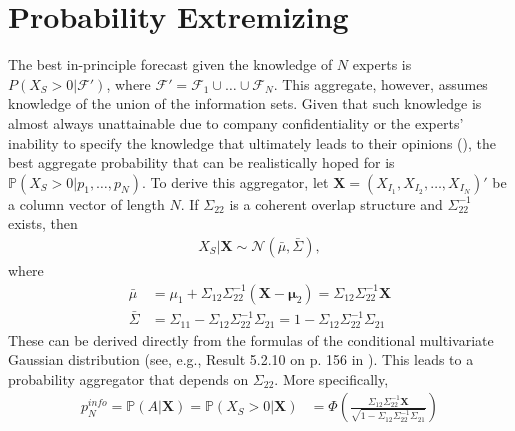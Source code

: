 \documentclass[11pt]{article}
\renewcommand{\P}{\mathbb{P}}
\theoremstyle{definition}
\theoremstyle{definition}
\begin{document}
\section{Probability Extremizing}
\label{extremizing}
The best in-principle forecast given the knowledge of $N$ experts is $P(X_{S} > 0 |  \mathcal{F}')$, where $\mathcal{F}' = \mathcal{F}_1 \cup \dots \cup \mathcal{F}_N$. This aggregate, however, assumes knowledge of the union of the information sets. Given that such knowledge is almost always unattainable due to company confidentiality or the experts' inability to specify the knowledge that ultimately leads to their opinions (\cite{dawid1995coherent}), the best aggregate probability that can be realistically hoped for is  $\P(X_{S} > 0 | p_1, \dots, p_N)$. 
To derive this aggregator, let $\boldsymbol{X} = (X_{I_1}, X_{I_2},  \dots, X_{I_N})'$ be a column vector of length $N$. If $\Sigma_{22}$ is a coherent overlap structure and $\Sigma_{22}^{-1}$ exists, then 
\begin{align*}
X_{S} | \boldsymbol{X} \sim \mathcal{N}(\bar{\mu}, \bar{\Sigma}), 
\end{align*}
where
\begin{align}
\bar{\mu} &= \mu_1 + \Sigma_{12} \Sigma_{22}^{-1} (\boldsymbol{X} - \boldsymbol{\mu}_2) =  \Sigma_{12} \Sigma_{22}^{-1} \boldsymbol{X} \label{condMu}\\
 \bar{\Sigma}&= \Sigma_{11} - \Sigma_{12} \Sigma_{22}^{-1} \Sigma_{21} =1 - \Sigma_{12} \Sigma_{22}^{-1} \Sigma_{21}  \label{condSigma}
\end{align}
These can be derived directly from the formulas of the conditional multivariate Gaussian distribution (see, e.g., Result 5.2.10 on p. 156 in \cite{ravishanker2001first}). This leads to a probability aggregator that depends on $\Sigma_{22}$. More specifically,
\begin{align}
p_N^{info} = \P\left(A  | \boldsymbol{X}\right)  = \P\left(X_{S} > 0 | \boldsymbol{X}\right) &= \Phi\left( \frac{\Sigma_{12} \Sigma_{22}^{-1} \boldsymbol{X}}{\sqrt{1 - \Sigma_{12} \Sigma_{22}^{-1} \Sigma_{21}}}\right) \label{GeneralAggregator}
\end{align}
\end{document}
